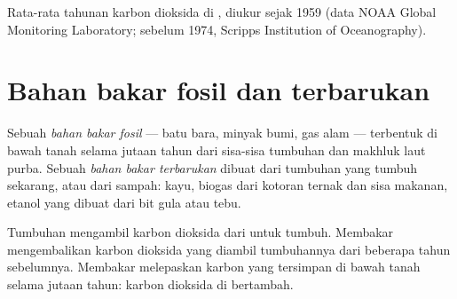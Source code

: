 \begin{omfigure}

{\small Rata-rata tahunan karbon dioksida di , diukur sejak 1959
(data NOAA Global Monitoring Laboratory; sebelum 1974, Scripps
Institution of Oceanography).}
\end{omfigure}

\section{Bahan bakar fosil dan terbarukan}

\begin{definition}\label{def:g8:combustion-and-fuels:fossil}
Sebuah \emph{bahan bakar fosil} --- batu bara,
minyak bumi, gas alam --- terbentuk di bawah tanah selama jutaan tahun
dari sisa-sisa tumbuhan dan makhluk laut purba. Sebuah
\emph{bahan bakar terbarukan} dibuat dari
tumbuhan yang tumbuh sekarang, atau dari sampah: kayu, biogas dari
kotoran ternak dan sisa makanan, etanol yang dibuat dari bit gula atau
tebu.
\end{definition}

\begin{proposition}\label{prop:g8:combustion-and-fuels:cycle}
Tumbuhan mengambil karbon dioksida dari  untuk tumbuh. Membakar
 mengembalikan karbon dioksida yang diambil
tumbuhannya dari  beberapa tahun sebelumnya. Membakar  melepaskan karbon yang tersimpan di bawah tanah selama jutaan
tahun: karbon dioksida di  bertambah.
\end{proposition}

